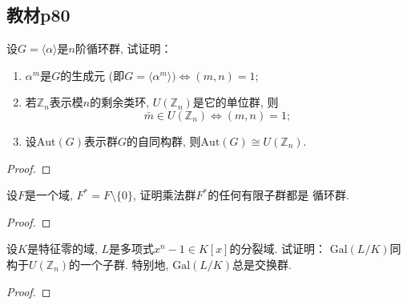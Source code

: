 \subsection{教材p80}

\begin{problem}
    设$G = \langle \alpha \rangle$是$n$阶循环群, 试证明：
\begin{enumerate}[(1)]
    \item $\alpha^m$是$G$的生成元 (即$G = \langle \alpha^m \rangle ) \Leftrightarrow (m, n) = 1$;
    \item 若$\mathbb{Z}_n$表示模$n$的剩余类环, $U(\mathbb{Z}_n)$是它的单位群, 则
\[
    \bar{m} \in U(\mathbb{Z}_n) \Leftrightarrow (m, n)=1;
\]
    \item 设$\mathrm{Aut}(G)$表示群$G$的自同构群, 则$\mathrm{Aut}(G) \cong U(\mathbb{Z}_n)$.
\end{enumerate}
\end{problem}

\begin{proof}
    
\end{proof}

\begin{problem}
    设$F$是一个域, $F^* = F \setminus \{0\}$, 证明乘法群$F^*$的任何有限子群都是
循环群.
\end{problem}

\begin{proof}
    
\end{proof}

\begin{problem}
    设$K$是特征零的域, $L$是多项式$x^n - 1 \in K[x]$的分裂域. 试证明：
$\mathrm{Gal}(L/K)$同构于$U(\mathbb{Z}_n)$的一个子群. 特别地, 
$\mathrm{Gal}(L/K)$总是交换群.
\end{problem}

\begin{proof}
    
\end{proof}